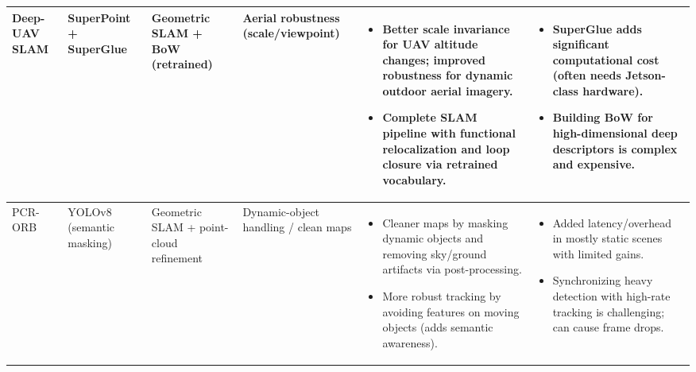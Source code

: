 \begin{table}[H]
{\begin{tabular}{|p{1.5cm}|p{1.5cm}|p{1.5cm}|p{1.5cm}|p{4.5cm}|p{4.5cm}|}
Deep-UAV SLAM & SuperPoint + SuperGlue & Geometric SLAM + BoW (retrained) & Aerial robustness (scale/viewpoint) &
\begin{itemize}[leftmargin=*, topsep=0pt, itemsep=0pt, parsep=0pt, partopsep=0pt]
  \item Better scale invariance for UAV altitude changes; improved robustness for dynamic outdoor aerial imagery.
  \item Complete SLAM pipeline with functional relocalization and loop closure via retrained vocabulary.
\end{itemize} &
\begin{itemize}[leftmargin=*, topsep=0pt, itemsep=0pt, parsep=0pt, partopsep=0pt]
  \item SuperGlue adds significant computational cost (often needs Jetson-class hardware).
  \item Building BoW for high-dimensional deep descriptors is complex and expensive.
\end{itemize} \\
\hline

PCR-ORB & YOLOv8 (semantic masking) & Geometric SLAM + point-cloud refinement & Dynamic-object handling / clean maps &
\begin{itemize}[leftmargin=*, topsep=0pt, itemsep=0pt, parsep=0pt, partopsep=0pt]
  \item Cleaner maps by masking dynamic objects and removing sky/ground artifacts via post-processing.
  \item More robust tracking by avoiding features on moving objects (adds semantic awareness).
\end{itemize} &
\begin{itemize}[leftmargin=*, topsep=0pt, itemsep=0pt, parsep=0pt, partopsep=0pt]
  \item Added latency/overhead in mostly static scenes with limited gains.
  \item Synchronizing heavy detection with high-rate tracking is challenging; can cause frame drops.
\end{itemize} \\
\hline
\end{tabular}}
\label{tab:DL_VINS_comparison}
\end{table}




